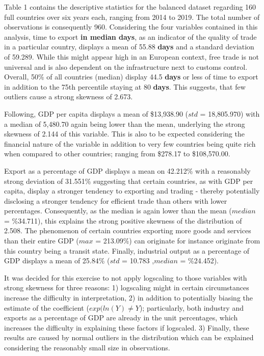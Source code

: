 \documentclass[a4paper]{article}
\begin{document}
Table 1 contains the descriptive statistics for the balanced dataset regarding 160 full countries over six years each, ranging from 2014 to 2019. The total number of observations is consequently 960.
Considering the four variables contained in this analysis, time to export \textbf{in median days}, as an indicator of the quality of trade in a particular country, displays a mean of 55.88 \textbf{days} and a standard deviation of 59.289. While this might appear high in an European context, free trade is not universal and is also dependent on the infrastructure next to customs control. Overall, 50\% of all countries (median) display 44.5 \textbf{days} or less of time to export in addition to the 75th percentile staying at 80 \textbf{days}. This suggests, that few outliers cause a strong skewness of 2.673.

Following, GDP per capita displays a mean of \$13,938.90 ($std$ = 18,805.970) with a median of 5,480.70 again being lower than the mean, underlying the strong skewness of 2.144 of this variable. This is also to be expected considering the financial nature of the variable in addition to very few countries being quite rich when compared to other countries; ranging from \$278.17 to \$108,570.00.

Export as a percentage of GDP displays a mean on 42.212\% with a reasonably strong deviation of 31.551\% suggesting that certain countries, as with GDP per capita, display a stronger tendency to exporting and trading - thereby potentially disclosing a stronger tendency for efficient trade than others with lower percentages. Consequently, as the median is again lower than the mean ($median$ = \%34.711), this explains the strong positive skewness of the distribution of 2.508. The phenomenon of certain countries exporting more goods and services than their entire GDP ($max$ = 213.09\%) can originate for instance originate from this country being a transit state. Finally, industrial output as a percentage of GDP displays a mean of 25.84\% ($std$ = 10.783 ,$median$ = \%24.452).

It was decided for this exercise to not apply logscaling to those variables with strong skewness for three reasons: 1) logscaling might in certain circumstances increase the difficulty in interpretation, 2) in addition to potentially biasing the estimate of the coefficient ($exp(ln(Y) \neq Y$); particularly, both industry and exports as a percentage of GDP are already in the unit  percentages, which increases the difficulty in explaining these factors if logscaled. 3) Finally, these results are caused by normal outliers in the distribution which can be explained considering the reasonably small size in observations.
\end{document}
